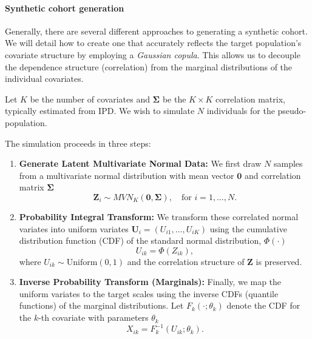 \documentclass[article]{jss}
\begin{document}
\paragraph{Synthetic cohort generation}
Generally, there are several different approaches to generating a synthetic cohort. We will detail how to create one that accurately reflects the target population's covariate structure by employing a {\it Gaussian copula}. This allows us to decouple the dependence structure (correlation) from the marginal distributions of the individual covariates.

Let $K$ be the number of covariates and $\boldsymbol{\Sigma}$ be the $K \times K$ correlation matrix, typically estimated from IPD. We wish to simulate $N$ individuals for the pseudo-population.

The simulation proceeds in three steps:

\begin{enumerate}
    \item \textbf{Generate Latent Multivariate Normal Data:}
    We first draw $N$ samples from a multivariate normal distribution with mean vector $\mathbf{0}$ and correlation matrix $\boldsymbol{\Sigma}$
    \begin{equation*}
        \mathbf{Z}_i \sim MVN_K(\mathbf{0}, \boldsymbol{\Sigma}), \quad \text{for } i = 1, \dots, N.
    \end{equation*}

    \item \textbf{Probability Integral Transform:}
    We transform these correlated normal variates into uniform variates $\mathbf{U}_i = (U_{i1}, \dots, U_{iK})$ using the cumulative distribution function (CDF) of the standard normal distribution, $\Phi(\cdot)$
    \begin{equation*}
        U_{ik} = \Phi(Z_{ik}),
    \end{equation*}
    where $U_{ik} \sim \text{Uniform}(0, 1)$ and the correlation structure of $\mathbf{Z}$ is preserved.

    \item \textbf{Inverse Probability Transform (Marginals):}
    Finally, we map the uniform variates to the target scales using the inverse CDFs (quantile functions) of the marginal distributions. Let $F_k(\cdot; \theta_k)$ denote the CDF for the $k$-th covariate with parameters $\theta_k$
    \begin{equation}
        \label{eqn:marginal-transformation}
        X_{ik} = F_k^{-1}(U_{ik}; \theta_k).
    \end{equation}
\end{enumerate}
\end{document}
